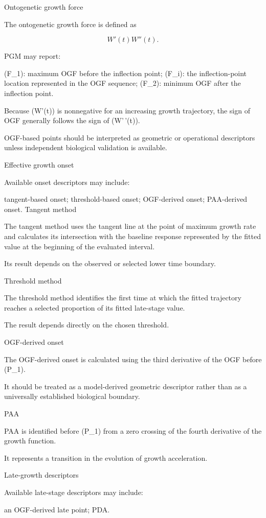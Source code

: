 \documentclass[
  english,
  letterpaper,
  DIV=11,
  numbers=noendperiod]{scrreprt}
\begin{document}
Ontogenetic growth force

The ontogenetic growth force is defined as

\[
W'(t)W''(t).
\]

PGM may report:

(F\_1): maximum OGF before the inflection point; (F\_i): the
inflection-point location represented in the OGF sequence; (F\_2):
minimum OGF after the inflection point.

Because (W'(t)) is nonnegative for an increasing growth trajectory, the
sign of OGF generally follows the sign of (W'\,'(t)).

OGF-based points should be interpreted as geometric or operational
descriptors unless independent biological validation is available.

Effective growth onset

Available onset descriptors may include:

tangent-based onset; threshold-based onset; OGF-derived onset;
PAA-derived onset. Tangent method

The tangent method uses the tangent line at the point of maximum growth
rate and calculates its intersection with the baseline response
represented by the fitted value at the beginning of the evaluated
interval.

Its result depends on the observed or selected lower time boundary.

Threshold method

The threshold method identifies the first time at which the fitted
trajectory reaches a selected proportion of its fitted late-stage value.

The result depends directly on the chosen threshold.

OGF-derived onset

The OGF-derived onset is calculated using the third derivative of the
OGF before (P\_1).

It should be treated as a model-derived geometric descriptor rather than
as a universally established biological boundary.

PAA

PAA is identified before (P\_1) from a zero crossing of the fourth
derivative of the growth function.

It represents a transition in the evolution of growth acceleration.

Late-growth descriptors

Available late-stage descriptors may include:

an OGF-derived late point; PDA.
\end{document}
